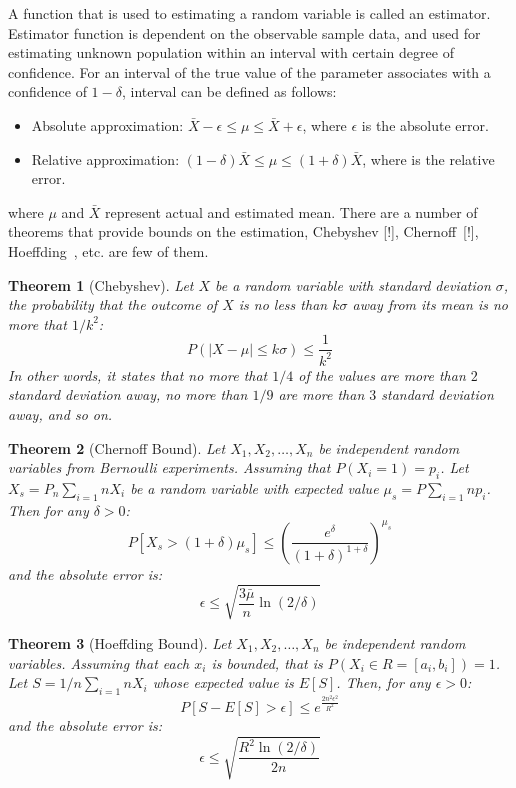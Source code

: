 \documentclass[a4paper, 11pt, oneside]{book}
\newtheorem{theorem}{Theorem}[section]
\begin{document}
A function that is used to estimating a random variable is called an estimator. Estimator function is dependent on the observable sample data, and used for estimating unknown population within an interval with certain degree of confidence. For an interval of the true value of the parameter associates with a confidence of $1 - \delta$, interval can be defined as follows:

\begin{itemize}    
    \item Absolute approximation: $\bar{X} - \epsilon \le \mu \le \bar{X} + \epsilon$, where $\epsilon$ is the absolute error.
    \item Relative approximation: $(1 - \delta)\bar{X} \le \mu \le (1 + \delta)\bar{X}$, where  is the relative error.
\end{itemize}

where $\mu$ and $\bar{X}$ represent actual and estimated mean. There are a number of theorems that provide bounds on the estimation, Chebyshev [!], Chernoff~[!], Hoeffding~\cite{hoeffding63:bound}, etc. are few of them.

\begin{theorem}[Chebyshev]
\label{thm:chebyshev}
    Let $X$ be a random variable with standard deviation $\sigma$, the probability that the outcome of $X$ is no less than $k\sigma$ away from its mean is no more that $1/k^2$:
    \[
        P(|X-\mu| \le k\sigma) \le \frac{1}{k^2}
    \]
    In other words, it states that no more that $1/4$ of the values are more than $2$ standard deviation away, no more than $1/9$ are more than $3$ standard deviation away, and so on.
\end{theorem}

\begin{theorem}[Chernoff Bound]
\label{thm:chernoff}
    Let $X_1,X_2,\dots, X_n$ be independent random variables from Bernoulli experiments. Assuming that $P(X_i = 1) = p_i$. Let $X_s = P_n \sum_{i=1}{n} X_i$ be a random variable with expected value $\mu_s = P \sum_{i=1} np_i$. Then for any $\delta > 0$:
    \[
        P[X_s > (1+\delta) \mu_s] \le (\frac{e^\delta}{(1 + \delta)^{1 +\delta}} )  ^{\mu_s}
    \]
    and the absolute error is:
    \[
        \epsilon \le \sqrt{\frac{3 \bar{\mu}}{n} \ln (2/\delta)}
    \]
\end{theorem}

\begin{theorem}[Hoeffding Bound]
\label{thm:hoeffding}
    Let $X_1,X_2,\dots, X_n$ be independent random variables. Assuming that each $x_i$ is bounded, that is $P(X_i \in R = [a_i, b_i]) = 1$. Let $S = 1/n \sum_{i=1}{n} X_i$ whose expected value is $E[S]$. Then, for any $\epsilon > 0$:
    \[
        P[S - E[S] > \epsilon] \le e^{ \frac{2 n^2 \epsilon^2}{R^2} }
    \]
    and the absolute error is:
    \[
        \epsilon \le \sqrt{\frac{R^2 \ln(2/\delta)}{2n}}
    \]
\end{theorem}
\end{document}
